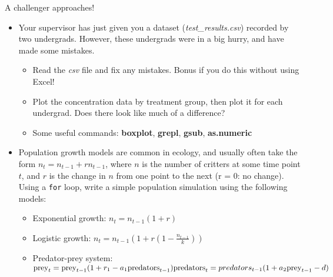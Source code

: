 \documentclass[
  ignorenonframetext,
  aspectratio=169]{beamer}
\providecommand{\tightlist}{%
  \setlength{\itemsep}{0pt}\setlength{\parskip}{0pt}}
\begin{document}
\begin{frame}{A challenger approaches!}
\protect\hypertarget{a-challenger-approaches}{}
\begin{itemize}[<+->]
\item
  Your supervisor has just given you a dataset
  (\emph{test\_results.csv}) recorded by two undergrads. However, these
  undergrads were in a big hurry, and have made some mistakes.

  \begin{itemize}[<+->]
  \item
    Read the \emph{csv} file and fix any mistakes. Bonus if you do this
    without using Excel!
  \item
    Plot the concentration data by treatment group, then plot it for
    each undergrad. Does there look like much of a difference?
  \item
    Some useful commands: \textbf{boxplot}, \textbf{grepl},
    \textbf{gsub}, \textbf{as.numeric}
  \end{itemize}
\item
  Population growth models are common in ecology, and usually often take
  the form \(n_t = n_{t-1} + rn_{t-1}\), where \(n\) is the number of
  critters at some time point \(t\), and \(r\) is the change in \(n\)
  from one point to the next (r = 0: no change). Using a \texttt{for}
  loop, write a simple population simulation using the following models:

  \begin{itemize}[<+->]
  \tightlist
  \item
    Exponential growth: \(n_t = n_{t-1}(1+r)\)
  \item
    Logistic growth: \(n_t = n_{t-1}(1+ r(1-\frac{n_{t-1}}{k}))\)
  \item
    Predator-prey system:
    \(\text{prey}_t = \text{prey}_{t-1}(1+ r_1 - a_1\text{predators}_{t-1})\\\text{predators}_t = predators_{t-1}(1 + a_2\text{prey}_{t-1}-d)\)
  \end{itemize}
\end{itemize}
\end{frame}
\end{document}
